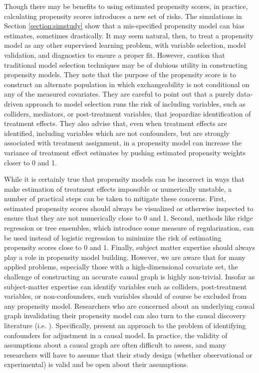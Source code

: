 \documentclass[aos]{imsart}
\begin{document}
Though there may be benefits to using estimated propensity scores, in practice, calculating propensity scores introduces a new set of risks. The simulations in Section \ref{section:simstudy} 
show that a mis-specified propensity model can bias estimates, sometimes drastically. It may seem natural, then, to treat a propensity model as any other supervised learning 
problem, with variable selection, model validation, and diagnostics to ensure a proper fit. However, \cite{hernan2020causal} caution that traditional model selection techniques may 
be of dubious utility in constructing propensity models. They note that the purpose of the propensity score is to construct an alternate population in which exchangeability is not 
conditional on any of the measured covariates. They are careful to point out that a purely data-driven approach to model selection runs the risk of including variables, such as 
colliders, mediators, or post-treatment variables, that jeopardize identification of treatment effects. They also advise that, even when treatment effects are identified, including 
variables which are not confounders, but are strongly associated with treatment assignment, in a propensity model can increase the variance of treatment effect estimates 
by pushing estimated propensity weights closer to 0 and 1.

While it is certainly true that propensity models can be incorrect in ways that make estimation of treatment effects impossible or numerically unstable, a number of practical steps 
can be taken to mitigate these concerns. First, estimated propensity scores should always be visualized or otherwise inspected to ensure that they are 
not numerically close to 0 and 1. Second, methods like ridge regression or tree ensembles, which introduce some measure of regularization, can be used instead of logistic regression 
to minimize the risk of estimating propensity scores close to 0 and 1. Finally, subject matter expertise should always play a role in propensity model building. However, we are aware that 
for many applied problems, especially those with a high-dimensional covariate set, the challenge of constructing an accurate causal graph is highly non-trivial. Insofar as subject-matter 
expertise can identify variables such as colliders, post-treatment variables, or non-confounders, such variables should of course be excluded from any propensity model. 
Researchers who are concerned about an underlying causal graph invalidating their propensity model can also turn to the causal discovery literature (i.e. \cite{peters2017elements}). Specifically, 
\cite{pmlr-v31-entner13a} present an approach to the problem of identifying confounders for adjustment in a causal model. In practice, the validity of assumptions about a causal graph 
are often difficult to assess, and many researchers will have to assume that their study design (whether observational or experimental) is valid and be open about their assumptions. 
\end{document}
